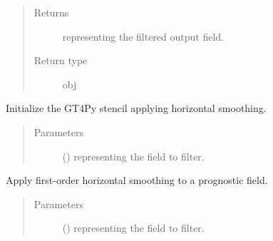 \documentclass[letterpaper,10pt,english]{sphinxmanual}
\begin{document}
\begin{fulllineitems}
\begin{fulllineitems}
\begin{quote}
\begin{description}
\begin{itemize}
\end{itemize}

\item[{Returns}] \leavevmode
{} representing the filtered output field.

\item[{Return type}] \leavevmode
obj

\end{description}\end{quote}

\end{fulllineitems}


\begin{fulllineitems}
\label{\detokenize{api:dycore.horizontal_smoothing.HorizontalSmoothingFirstOrderYZ._stencil_initialize}}
Initialize the GT4Py stencil applying horizontal smoothing.
\begin{quote}\begin{description}
\item[{Parameters}] \leavevmode
{} () \textendash{}  representing the field to filter.

\end{description}\end{quote}

\end{fulllineitems}


\begin{fulllineitems}
\label{\detokenize{api:dycore.horizontal_smoothing.HorizontalSmoothingFirstOrderYZ.apply}}
Apply first-order horizontal smoothing to a prognostic field.
\begin{quote}\begin{description}
\item[{Parameters}] \leavevmode
{} () \textendash{}  representing the field to filter.


\end{description}
\end{quote}
\end{fulllineitems}
\end{fulllineitems}
\end{document}
